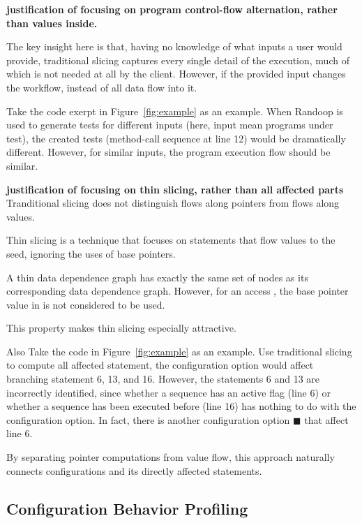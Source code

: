 \textbf{justification of focusing on program control-flow
alternation, rather than values inside.}

The key insight here is that, having no knowledge of
what inputs a user would provide, traditional slicing
captures every single detail of the execution, much
of which is not needed at all by the client.
However, if the provided input changes the workflow,
instead of all data flow into it. 

Take the code exerpt in Figure~\ref{fig:example} as an example.
When Randoop is used to generate tests for different inputs (here,
input mean programs under test), the created tests (method-call
sequence at line 12) would be dramatically different.
However, for similar inputs, the program execution flow should
be similar.

\textbf{justification of focusing on thin slicing, rather
than all affected parts}
Tranditional slicing does not distinguish flows along
pointers from flows along values.

Thin slicing is a technique that focuses on statements
that flow values to the seed, ignoring the uses of
base pointers.

A thin data dependence graph has exactly
the same set of nodes as its corresponding data dependence
graph. However, for an access , the base pointer value
in  is not considered to be used. 

This property makes thin slicing
especially attractive.

Also Take the code in Figure~\ref{fig:example} as an example.
Use traditional slicing to compute all affected statement,
the configuration option  would affect
branching statement 6, 13, and 16. However, the
statements 6 and 13 are incorrectly identified, since
whether a sequence has an active flag (line 6) or
whether a sequence has been executed before (line 16)
has nothing to do with the  configuration option.
In fact, there is another configuration option $\blacksquare$
that affect line 6.


By separating pointer computations from value flow,
this approach naturally connects configurations and its
directly affected statements.


\subsection{Configuration Behavior Profiling}
\label{sec:profiling}

